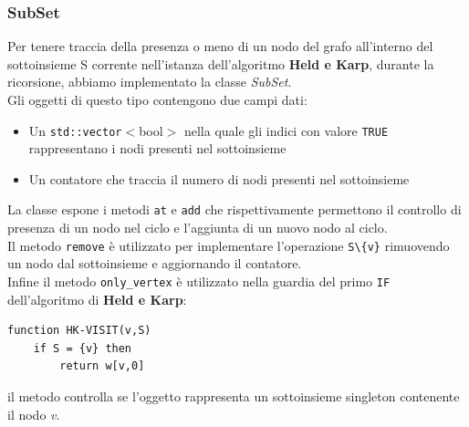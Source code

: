 \documentclass[]{article}
\begin{document}
\subsubsection{SubSet}
\begin{flushleft}
Per tenere traccia della presenza o meno di un nodo del grafo all'interno del sottoinsieme S corrente nell'istanza dell'algoritmo \textbf{Held e Karp}, durante la ricorsione, abbiamo implementato la classe \textit{SubSet}.\\
Gli oggetti di questo tipo contengono due campi dati:
\begin{itemize}
	\item Un \verb|std::vector|$<$bool$>$ nella quale gli indici con valore \verb|TRUE| rappresentano i nodi presenti nel sottoinsieme
	\item Un contatore che traccia il numero di nodi presenti nel sottoinsieme
\end{itemize}

La classe espone i metodi \verb|at| e \verb|add| che rispettivamente permettono il controllo di presenza di un nodo nel ciclo e l'aggiunta di un nuovo nodo al ciclo.\\
Il metodo \verb|remove| è utilizzato per implementare l'operazione \verb|S\{v}| rimuovendo un nodo dal sottoinsieme e aggiornando il contatore.\\
Infine il metodo \verb|only_vertex| è utilizzato nella guardia del primo \verb|IF| dell'algoritmo di \textbf{Held e Karp}:
\begin{lstlisting}[mathescape=true]
function HK-VISIT(v,S)
	if S = {v} then
		return w[v,0]
\end{lstlisting}
il metodo controlla se l'oggetto rappresenta un sottoinsieme singleton contenente il nodo \textit{v}.
\end{flushleft}
\end{document}

